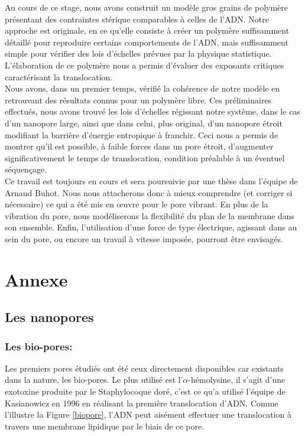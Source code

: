 \documentclass[a4paper,11pt]{article}
\begin{document}
Au cours de ce stage, nous avons construit un modèle gros grains de polymère présentant des contraintes stérique comparables à celles de l'ADN. Notre approche est originale, en ce qu'elle consiste à créer un polymère suffisamment détaillé pour reproduire certains comportements de l'ADN, mais suffisamment simple pour vérifier des lois d'échelles prévues par la physique statistique. L'élaboration de ce polymère nous a permis d'évaluer des exposants critiques caractérisant la translocation.\\

Nous avons, dans un premier temps, vérifié la cohérence de notre modèle en retrouvant des résultats connus pour un polymère libre. Ces préliminaires effectués, nous avons trouvé les lois d'échelles régissant notre système, dans le cas d'un nanopore large, ainsi que dans celui, plus original, d'un nanopore étroit modifiant la barrière d'énergie entropique à franchir. Ceci nous a permis de montrer qu'il est possible, à faible forces dans un pore étroit, d'augmenter significativement le temps de translocation, condition préalable à un éventuel séquençage.\\

Ce travail est toujours en cours et sera poursuivie par une thèse dans l'équipe de Arnaud Buhot. Nous nous attacherons donc à mieux comprendre (et corriger si nécessaire) ce qui a été mis en œuvre pour le pore vibrant. En plus de la vibration du pore, nous modéliserons la flexibilité du plan de la membrane dans son ensemble. Enfin, l'utilisation d'une force de type électrique, agissant dans au sein du pore, ou encore un travail à vitesse imposée, pourront être envisagés.







\newpage

\section{Annexe}

\subsection*{Les nanopores}



\subsubsection*{Les bio-pores:}
Les premiers pores étudiés ont été ceux directement disponibles car existants dans la nature, les bio-pores. Le plus utilisé est l'$\alpha$-hémolysine, il s'agit d'une exotoxine produite par le Staphylocoque doré, c'est ce qu'a utilisé l'équipe de Kasianowicz \cite{kasianowicz} en 1996 en réalisant la première translocation d'ADN. Comme l'illustre la Figure \ref{biopore}, l'ADN peut aisément effectuer une translocation à travers une membrane lipidique par le biais de ce pore. \\
\end{document}
